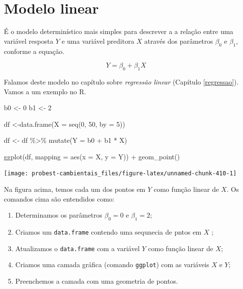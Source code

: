 \documentclass[
]{book}
\newenvironment{Shaded}{\begin{snugshade}}{\end{snugshade}}
\newcommand{\AttributeTok}[1]{\textcolor[rgb]{0.77,0.63,0.00}{#1}}
\newcommand{\DecValTok}[1]{\textcolor[rgb]{0.00,0.00,0.81}{#1}}
\newcommand{\FunctionTok}[1]{\textcolor[rgb]{0.00,0.00,0.00}{#1}}
\newcommand{\NormalTok}[1]{#1}
\newcommand{\OtherTok}[1]{\textcolor[rgb]{0.56,0.35,0.01}{#1}}
\newcommand{\SpecialCharTok}[1]{\textcolor[rgb]{0.00,0.00,0.00}{#1}}
\begin{document}
\hypertarget{modelo-linear}{%
\section{Modelo linear}\label{modelo-linear}}

É o modelo determinístico mais simples para descrever a a relação entre uma variável resposta \(Y\) e uma variável preditora \(X\) através dos parâmetros \(\beta_0\) e \(\beta_1\), conforme a equação.

\[Y = \beta_0 + \beta_1X\]

Falamos deste modelo no capítulo sobre \emph{regressão linear} (Capítulo \ref{regressao}).
Vamos a um exemplo no R.

\begin{Shaded}
\begin{Highlighting}[]
\NormalTok{b0 }\OtherTok{\textless{}{-}} \DecValTok{0}
\NormalTok{b1 }\OtherTok{\textless{}{-}} \DecValTok{2}

\NormalTok{df }\OtherTok{\textless{}{-}}\FunctionTok{data.frame}\NormalTok{(}\AttributeTok{X =} \FunctionTok{seq}\NormalTok{(}\DecValTok{0}\NormalTok{, }\DecValTok{50}\NormalTok{, }\AttributeTok{by =} \DecValTok{5}\NormalTok{))}

\NormalTok{df }\OtherTok{\textless{}{-}}\NormalTok{ df }\SpecialCharTok{\%\textgreater{}\%} \FunctionTok{mutate}\NormalTok{(}\AttributeTok{Y =}\NormalTok{ b0 }\SpecialCharTok{+}\NormalTok{ b1 }\SpecialCharTok{*}\NormalTok{ X)}

\FunctionTok{ggplot}\NormalTok{(df, }\AttributeTok{mapping =} \FunctionTok{aes}\NormalTok{(}\AttributeTok{x =}\NormalTok{ X, }\AttributeTok{y =}\NormalTok{ Y)) }\SpecialCharTok{+}
  \FunctionTok{geom\_point}\NormalTok{()}
\end{Highlighting}
\end{Shaded}

\begin{center}\texttt{[image: probest-cambientais\_files/figure-latex/unnamed-chunk-410-1]} \end{center}

Na figura acima, temos cada um dos pontos em \(Y\) como função linear de \(X\). Os comandos cima são entendidos como:

\begin{enumerate}
\def\labelenumi{\arabic{enumi}.}
\item
  Determinamos os parâmetros \(\beta_0 = 0\) e \(\beta_1 = 2\);
\item
  Criamos um \texttt{data.frame} contendo uma sequnecia de pntos em \(X\) ;
\item
  Atualizamos o \texttt{data.frame} com a variável \(Y\) como função linear de \(X\);
\item
  Criamos uma camada gráfica (comando \texttt{ggplot}) com as variáveis \(X\) e \(Y\);
\item
  Preenchemos a camada com uma geometria de pontos.
\end{enumerate}
\end{document}
